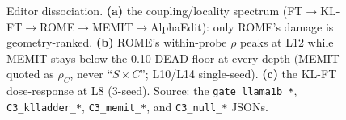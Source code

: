 \begin{figure}[t]
\caption{Editor dissociation. \textbf{(a)} the coupling/locality spectrum
(FT$\to$KL-FT$\to$ROME$\to$MEMIT$\to$AlphaEdit): only ROME's damage is geometry-ranked.
\textbf{(b)} ROME's within-probe $\rho$ peaks at L12 while MEMIT stays below the 0.10
DEAD floor at every depth (MEMIT quoted as $\rho_C$, never ``$S\times C$''; L10/L14
single-seed). \textbf{(c)} the KL-FT dose-response at L8 (3-seed). Source: the
\texttt{gate\_llama1b\_*}, \texttt{C3\_klladder\_*}, \texttt{C3\_memit\_*}, and
\texttt{C3\_null\_*} JSONs.}
\label{fig:editor}
\end{figure}
